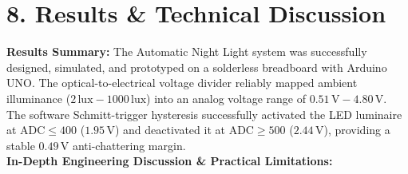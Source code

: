 \documentclass[10pt,a4paper]{article}
\begin{document}
\newpage

\section*{8. Results \& Technical Discussion}
\noindent\textbf{Results Summary:} The Automatic Night Light system was successfully designed, simulated, and prototyped on a solderless breadboard with Arduino UNO. The optical-to-electrical voltage divider reliably mapped ambient illuminance ($2\,\text{lux} - 1000\,\text{lux}$) into an analog voltage range of $0.51\,\text{V} - 4.80\,\text{V}$. The software Schmitt-trigger hysteresis successfully activated the LED luminaire at $\text{ADC} \le 400$ ($1.95\,\text{V}$) and deactivated it at $\text{ADC} \ge 500$ ($2.44\,\text{V}$), providing a stable $0.49\,\text{V}$ anti-chattering margin.\\[0.05cm]
\textbf{In-Depth Engineering Discussion \& Practical Limitations:}
\end{document}
